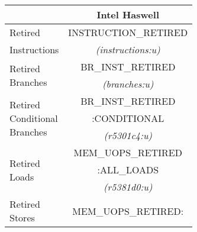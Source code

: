 \begin{tabular}{|l||c|}

\hline
    & 
Intel Haswell 	\\

\hline
\hline


Retired                   &
INSTRUCTION\_RETIRED      \\ %


Instructions                &
{\em (instructions:u)}      \\ %



\hline
\multirow{3}{*}{\parbox{0.5in}{Retired \\
Branches}}                &
\multirow{2}{*}{BR\_INST\_RETIRED}	\\ %

		&
		\\ %


                           &
{\em (branches:u)}         \\ %



\hline
\multirow{3}{*}{\parbox{0.5in}{Retired \\
Conditional \\
Branches}}                &
BR\_INST\_RETIRED    \\ %

                  &
:CONDITIONAL                  \\ %

			&
{\em (r5301c4:u)}	\\ %


\hline
\multirow{3}{*}{\parbox{0.5in}{Retired \\Loads}}   &  
MEM\_UOPS\_RETIRED        \\ %

                         &
:ALL\_LOADS              \\ %


                         &
{\em (r5381d0:u)}	\\ %


\hline
\multirow{3}{*}{\parbox{0.5in}{Retired \\Stores}}              &  
MEM\_UOPS\_RETIRED:       \\ %


\end{tabular}
